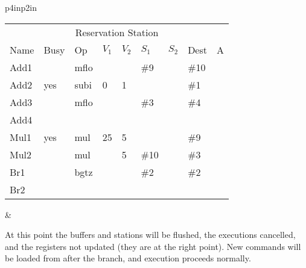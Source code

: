 \begin{tabular}{p{4in}p{2in}}
\noindent
\begin{tabular}{lllllllll}
\multicolumn{9}{c}{Reservation Station} \\
Name & Busy & Op   & $V_1$ & $V_2$ & $S_1$ & $S_2$ & Dest & A \\ \hline
Add1 &      & mflo &       &       & \#9   &       & \#10 &   \\
Add2 & yes  & subi & 0     & 1     &       &       & \#1  &   \\
Add3 &      & mflo &       &       & \#3   &       & \#4  &   \\
Add4 &      &      &       &       &       &       &      &   \\ \hline
Mul1 & yes  & mul  & 25    & 5     &       &       & \#9  &   \\
Mul2 &      & mul  &       & 5     & \#10  &       & \#3  &   \\ \hline
Br1  &      & bgtz &       &       & \#2   &       & \#2  &   \\
Br2  &      &      &       &       &       &       &      &   \\
\end{tabular} &  \\
\end{tabular}

At this point the buffers and stations will be flushed, the executions cancelled, and the registers not updated (they are at the right point).  New commands will be loaded from after the branch, and execution proceeds normally. 